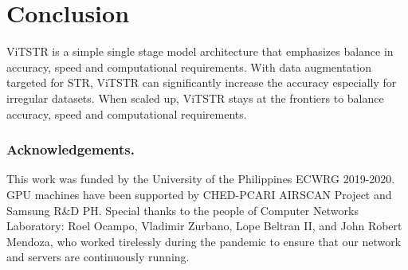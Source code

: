\documentclass[runningheads]{llncs}
\begin{document}
\section{Conclusion}
ViTSTR is a simple single stage model architecture that emphasizes balance in accuracy, speed and computational requirements. With data augmentation targeted for STR, ViTSTR can significantly increase the accuracy especially for irregular datasets. When scaled up, ViTSTR stays at the frontiers to balance accuracy, speed and computational requirements.

\subsubsection*{Acknowledgements.}
This work was funded by the University of the Philippines ECWRG 2019-2020. GPU machines have been supported by CHED-PCARI AIRSCAN Project and Samsung R\&D PH. Special thanks to the people of Computer Networks Laboratory: Roel Ocampo, Vladimir Zurbano, Lope Beltran II, and John Robert Mendoza, who worked tirelessly during the pandemic to ensure that our network and servers are continuously running.



\end{document}
